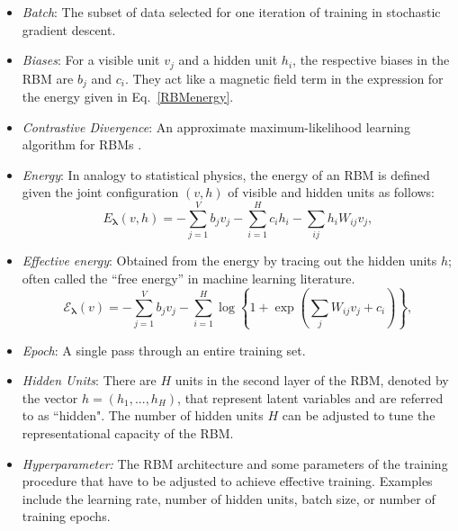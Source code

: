 \documentclass[submission, Phys]{SciPost}
\begin{document}
\begin{itemize}

	\item {\it Batch}: The subset of data selected for one iteration of training in stochastic gradient descent.

	\item {\it Biases}: For a visible unit $v_j$ and a hidden unit $h_i$, the respective biases in the RBM are $b_j$ and $c_i$. They act like a magnetic field term in the expression for the energy given in Eq.~\eqref{RBMenergy}.

	\item {\it Contrastive Divergence}: An approximate maximum-likelihood learning algorithm for RBMs \cite{hinton2002training}.

	\item {\it Energy}: In analogy to statistical physics, the energy of an RBM is defined given the joint configuration $(v,h)$ of visible and hidden units as follows:
	      \begin{equation}
		      E_{\bm{\lambda}}(v,h) = - \sum\limits_{j=1}^V b_j v_j - \sum\limits_{i=1}^H c_i h_i - \sum\limits_{ij} h_i W_{ij} v_j, \label{RBMenergy}
	      \end{equation}

	\item {\it Effective energy}: Obtained from the energy by tracing out the hidden units $h$; often called the ``free energy'' in machine learning literature.
	      \begin{equation}
		      \mathcal{E}_{\bm{\lambda}}(v) = - \sum\limits_{j=1}^V b_j v_j - \sum\limits_{i=1}^H \log \left\{ 1 + \exp \left( \sum\limits_{j} W_{ij}v_j +c_i\right) \right\}, \label{RBMeffectiveenergy}
	      \end{equation}

	\item {\it Epoch}: A single pass through an entire training set.

	\item {\it Hidden Units}: There are $H$ units in the second layer of the RBM, denoted by the vector $h=(h_1, ..., h_H)$, that represent latent variables and are referred to as ``hidden". The number of hidden units $H$ can be adjusted to tune the representational capacity of the RBM.

	\item{\it Hyperparameter:} The RBM architecture and some parameters of the training procedure that have to be adjusted to achieve effective training. Examples include the learning rate, number of hidden units, batch size, or number of training epochs.


\end{itemize}
\end{document}
